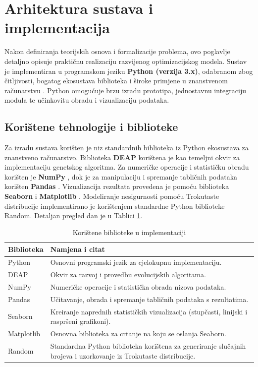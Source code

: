 \section{Arhitektura sustava i implementacija}
\label{chap:implementacija}
Nakon definiranja teorijskih osnova i formalizacije problema, ovo poglavlje detaljno opisuje praktičnu realizaciju razvijenog optimizacijskog modela. Sustav je implementiran u programskom jeziku \textbf{Python (verzija 3.x)}, odabranom zbog čitljivosti, bogatog ekosustava biblioteka i široke primjene u znanstvenom računarstvu \cite{PythonSoftwareFoundation}. Python omogućuje brzu izradu prototipa, jednostavnu integraciju modula te učinkovitu obradu i vizualizaciju podataka.
\subsection{Korištene tehnologije i biblioteke}
Za izradu sustava korišten je niz standardnih biblioteka iz Python ekosustava za znanstveno računarstvo. Biblioteka \textbf{DEAP} \cite{DEAP2012} korištena je kao temeljni okvir za implementaciju genetskog algoritma. Za numeričke operacije i statističku obradu korišten je \textbf{NumPy} \cite{Harris2020}, dok je za manipulaciju i spremanje tabličnih podataka korišten \textbf{Pandas} \cite{PandasDevelopmentTeam2020}. Vizualizacija rezultata provedena je pomoću biblioteka \textbf{Seaborn} \cite{Waskom2021} i \textbf{Matplotlib} \cite{Hunter2007}. Modeliranje nesigurnosti pomoću Trokutaste distribucije implementirano je korištenjem standardne Python biblioteke Random. Detaljan pregled dan je u Tablici \ref{tab:biblioteke}.

\begin{table}[H]
\centering
\caption{Korištene biblioteke u implementaciji}
\label{tab:biblioteke}
\begin{tabular}{|l|p{10cm}|}
\hline
\textbf{Biblioteka} & \textbf{Namjena i citat} \\ \hline
Python & Osnovni programski jezik za cjelokupnu implementaciju. \cite{PythonSoftwareFoundation} \\ \hline
DEAP & Okvir za razvoj i provedbu evolucijskih algoritama. \cite{DEAP2012} \\ \hline
NumPy & Numeričke operacije i statistička obrada nizova podataka. \cite{Harris2020} \\ \hline
Pandas & Učitavanje, obrada i spremanje tabličnih podataka s rezultatima. \cite{PandasDevelopmentTeam2020} \\ \hline
Seaborn & Kreiranje naprednih statističkih vizualizacija (stupčasti, linijski i raspršeni grafikoni). \cite{Waskom2021} \\ \hline
Matplotlib & Osnovna biblioteka za crtanje na koju se oslanja Seaborn. \cite{Hunter2007} \\ \hline
Random & Standardna Python biblioteka korištena za generiranje slučajnih brojeva i uzorkovanje iz Trokutaste distribucije. \\ \hline
\end{tabular}
\end{table}

